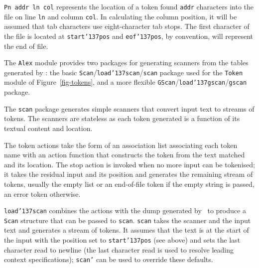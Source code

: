 \mbox{\tt Pn\ addr\ ln\ col} represents the location of a token found \mbox{\tt addr} characters
into the file on line \mbox{\tt ln} and column \mbox{\tt col}.  In calculating the column
position, it will be assumed that tab characters use eight-character tab stops.
The first character of the file is located at \mbox{\tt start{\char'137}pos} and \mbox{\tt eof{\char'137}pos}, by
convention, will represent the end of file.

The \mbox{\tt Alex} module provides two packages for generating scanners from the tables
generated by \lx: the basic \mbox{\tt Scan}/\mbox{\tt load{\char'137}scan}/\mbox{\tt scan} package used for the
\mbox{\tt Token} module of Figure~\ref{fig-tokens}, and a more flexible
\mbox{\tt GScan}/\mbox{\tt load{\char'137}gscan}/\mbox{\tt gscan} package.

The \mbox{\tt scan} package generates simple scanners that convert input text to streams
of tokens.  The scanners are stateless as each token generated is a function of
its textual content and location.
 
The token actions take the form of an association list associating each token
name with an action function that constructs the token from the text matched
and its location.  The stop action is invoked when no more input can be
tokenised; it takes the residual input and its position and generates the
remaining stream of tokens, usually the empty list or an end-of-file token if
the empty string is passed, an error token otherwise.


\mbox{\tt load{\char'137}scan} combines the actions with the dump generated by \lx\ to produce a
\mbox{\tt Scan} structure that can be passed to \mbox{\tt scan}.  \mbox{\tt scan} takes the scanner and
the input text and generates a stream of tokens.  It assumes that the text is
at the start of the input with the position set to \mbox{\tt start{\char'137}pos} (see above) and
sets the last character read to newline (the last character read is used to
resolve leading context specifications); \mbox{\tt scan'} can be used to override these
defaults.

